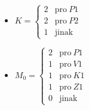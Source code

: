\documentclass[a4paper, 11pt, fleqn]{scrartcl}
\begin{document}
\begin{itemize}
		\item
			$ K =
				\begin{cases}
					2 & \text{pro}\ P1 \\
					2 & \text{pro}\ P2 \\
					1 & \text{jinak}
				\end{cases}
			$

		\item
			$ M_0 =
				\begin{cases}
					2 & \text{pro}\ P1 \\
					1 & \text{pro}\ V1 \\
					1 & \text{pro}\ K1 \\
					1 & \text{pro}\ Z1 \\
					0 & \text{jinak}
				\end{cases}
			$
	\end{itemize}
\end{document}
